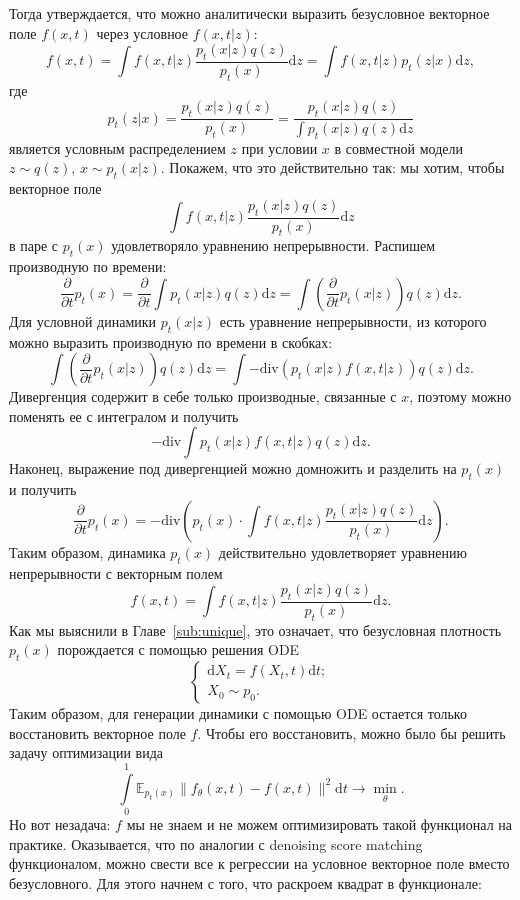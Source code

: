 \documentclass[12pt]{article}
\theoremstyle{definition}
\begin{document}
Тогда утверждается, что можно аналитически выразить безусловное векторное поле $f(x, t)$ через условное $f(x, t | z)$:
\[
    f(x, t) = \int f(x, t | z) \frac{p_t(x | z) q(z)}{p_t(x)} \mathrm{d} z = \int f(x, t | z) p_t(z | x) \mathrm{d} z,
\]
где 
\[
    p_t(z | x) = \frac{p_t(x | z) q(z)}{p_t(x)} = \frac{p_t(x | z) q(z)}{\int p_t(x | z) q(z) \mathrm{d} z}
\]
является условным распределением $z$ при условии $x$ в совместной модели $z \sim q(z), \, x \sim p_t(x | z)$. Покажем, что это действительно так: мы хотим, чтобы векторное поле
\[
    \int f(x, t | z) \frac{p_t(x | z) q(z)}{p_t(x)} \mathrm{d} z
\]
в паре с $p_t(x)$ удовлетворяло уравнению непрерывности. Распишем производную по времени:
\[
    \frac{\partial}{\partial t} p_t(x) = \frac{\partial}{\partial t} \int\limits p_t(x | z) q(z) \mathrm{d} z = \int \left(\frac{\partial}{\partial t} p_t(x | z)\right) q(z) \mathrm{d} z.
\]
Для условной динамики $p_t(x | z)$ есть уравнение непрерывности, из которого можно выразить производную по времени в скобках:
\[
    \int \left(\frac{\partial}{\partial t} p_t(x | z)\right) q(z) \mathrm{d} z = \int -\text{div}\left(p_t(x | z) f(x, t | z) \right) q(z) \mathrm{d} z.
\]
Дивергенция содержит в себе только производные, связанные с $x$, поэтому можно поменять ее с интегралом и получить
\[
-\text{div} \int p_t(x | z) f(x, t | z) q(z) \mathrm{d} z.
\]
Наконец, выражение под дивергенцией можно домножить и разделить на $p_t(x)$ и получить
\[
    \frac{\partial}{\partial t}p_t(x) = -\text{div} \left(p_t(x) \cdot \int f(x, t | z) \frac{p_t(x | z)q(z)}{p_t(x)} \mathrm{d} z\right).
\]
Таким образом, динамика $p_t(x)$ действительно удовлетворяет уравнению непрерывности с векторным полем
\[
    f(x, t) = \int f(x, t | z) \frac{p_t(x|z) q(z)}{p_t(x)}\mathrm{d} z.
\]
Как мы выяснили в Главе~\ref{sub:unique}, это означает, что безусловная плотность $p_t(x)$ порождается с помощью решения ODE
\[
    \begin{cases}
        \mathrm{d} X_t = f(X_t, t) \mathrm{d} t;\\
        X_0 \sim p_0.
    \end{cases}
\]
Таким образом, для генерации динамики с помощью ODE остается только восстановить векторное поле $f$. Чтобы его восстановить, можно было бы решить задачу оптимизации вида
\[
    \int \limits_{0}^{1} \mathbb{E}_{p_t(x)} \| f_\theta(x, t) - f(x, t) \|^2 \mathrm{d} t \rightarrow \min\limits_{\theta}.
\]
Но вот незадача: $f$ мы не знаем и не можем оптимизировать такой функционал на практике. Оказывается, что по аналогии с denoising score matching функционалом, можно свести все к регрессии на условное векторное поле вместо безусловного. Для этого начнем с того, что раскроем квадрат в функционале:
\end{document}

